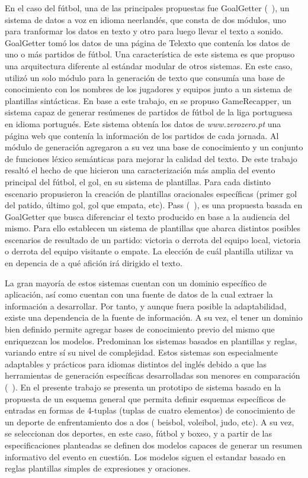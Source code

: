 En el caso del fútbol, una de las principales propuestas fue GoalGetter (~\cite{theune2001data}), un sistema de datos a voz en idioma neerlandés, que consta de dos módulos, uno para tranformar los datos en texto y 
otro para luego llevar el texto a sonido. GoalGetter tomó los datos de una página de Telexto que contenía los datos de uno o más partidos de fútbol. Una característica de este sistema es que propuso una arquitectura diferente al 
estándar modular de otros sistemas. En este caso, utilizó un solo módulo para la generación de texto que consumía una base de conocimiento con los nombres de los jugadores y equipos junto a un sistema de plantillas sintácticas.
En base a este trabajo, en \cite{aires2016automatic} se propuso GameRecapper, un sistema capaz de generar resúmenes de partidos de fútbol de la liga portuguesa en idioma portugués. Este sistema obtenía los datos de \textit{www.zerozero.pt} 
una página web que contenía la información de los partidos de cada jornada. Al módulo de generación agregaron a su vez una base de conocimiento y un conjunto de funciones léxico semánticas para mejorar la calidad del texto. De este trabajo resaltó el hecho 
de que hicieron una caracterización más amplia del evento principal del fútbol, el gol, en su sistema de plantillas. Para cada distinto escenario propusieron la creación de plantillas oracionales específicas (primer gol del patido, último gol, gol que empata, etc).
Pass (~\cite{van2017pass}), es una propuesta basada en GoalGetter que busca diferenciar el texto producido en base a la audiencia del mismo. Para ello establecen un sistema de plantillas que abarca distintos posibles escenarios de resultado de un partido: victoria o derrota 
del equipo local, victoria o derrota del equipo visitante o empate. La elección de cuál plantilla utilizar va en depencia de a qué afición irá dirigido el texto.  

    La gran mayoría de estos sistemas cuentan con un dominio específico de aplicación, así como cuentan con una fuente de datos de la 
cual extraer la información a desarrollar. Por tanto, y aunque fuera posible la adaptabilidad, existe una dependencia de la fuente de información. A su vez, el tener un dominio bien definido  
permite agregar bases de conocimiento previo del mismo que enriquezcan los modelos. Predominan los sistemas basados en plantillas y reglas, variando entre sí su nivel de complejidad. Estos 
sistemas son especialmente adaptables y prácticos para idiomas distintos del inglés debido a que las herramientas de generación específicas desarrolladas son menores en comparación (~\cite{gunasiri2021automated}). 
    En el presente trabajo se presenta un prototipo de sistema basado en la propuesta de un esquema general que permita definir esquemas específicos de entradas en formas de 4-tuplas (tuplas de cuatro elementos) de 
conocimiento de un deporte de enfrentamiento dos a dos ( beisbol, voleibol, judo, etc). A su vez, se seleccionan dos deportes, en este caso, fútbol y boxeo, y a partir de las especificaciones planteadas se 
definen dos modelos capaces de generar un resumen informativo del evento en cuestión. Los modelos siguen el estandar basado en reglas plantillas simples de expresiones y oraciones.

